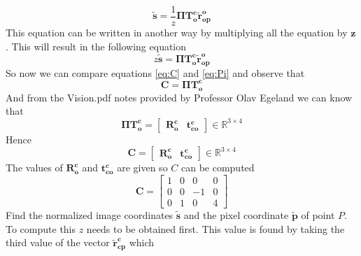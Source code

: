 \documentclass[12pt, letterpaper]{article}
\begin{document}
\begin{enumerate}
            \begin{equation}
                \bm{\tilde{s}=}\frac{1}{z}\bm{\Pi T_o^c\tilde{r}^o_{op}}
            \end{equation}
            This equation can be written in another way by multiplying all
            the equation by $\bm{z}$. This will result in the following equation
            \begin{equation}
                z\bm{\tilde{s}=\Pi T_o^c\tilde{r}^o_{op}}\label{eq:Pi}
            \end{equation}
            So now we can compare equations \eqref{eq:C} and \eqref{eq:Pi} and 
            observe that
            \begin{equation*}
                \bm{C}=\bm{\Pi T_o^c}
            \end{equation*}
            And from the Vision.pdf notes provided by Professor Olav Egeland we
            can know that
            \begin{equation*}
                \bm{\Pi T_o^c}=\begin{bmatrix}
                    \bm{R_o^c} & \bm{t^c_{co}}
                \end{bmatrix} \in \mathbb{R}^{3\times4}
            \end{equation*}
            Hence
            \begin{equation*}
                \bm{C}=\begin{bmatrix}
                    \bm{R_o^c} & \bm{t^c_{co}}
                \end{bmatrix} \in \mathbb{R}^{3\times4}
            \end{equation*}
            The values of $\bm{R_o^c}$ and $\bm{t^c_{co}}$ are given so $C$ can be
            computed
            \begin{equation*}
                \bm{C}=                
                \begin{bmatrix}
                    1 & 0 & 0 & 0\\
                    0 & 0 & -1 & 0\\
                    0 & 1 & 0 & 4
                \end{bmatrix}
            \end{equation*}
            Find the normalized image coordinates $\bm{\tilde{s}}$ and the pixel 
            coordinate $\bm{\tilde{p}}$ of point $P$.
            To compute this $z$ needs to be obtained first. This value is found
            by taking the third value of the vector $\bm{\tilde{r}^c_{cp}}$ which

\end{enumerate}
\end{document}
